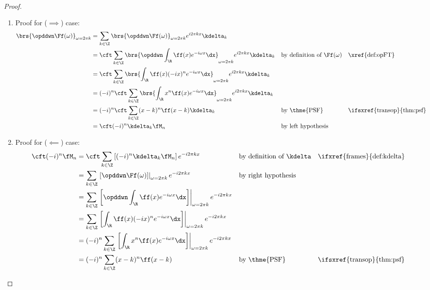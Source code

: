 \begin{proof}
\begin{enumerate}
  \item Proof for ($\implies$) case:
    \begin{align*}
      \brs{\opddwn  \Ff(\omega)}_{\omega=2\pi k}
        &= \sum_{k\in\Z} \brs{\opddwn  \Ff(\omega)}_{\omega=2\pi k}  e^{i2\pi kx} \kdelta_k
      \\&= \cft \sum_{k\in\Z} \brs{\opddwn \int_\R  \ff(x) e^{-i\omega x} \dx}_{\omega=2\pi k} e^{i2\pi kx}  \kdelta_k
        && \text{by definition of $\Ff(\omega)$}
        && \text{\xref{def:opFT}}
      \\&= \cft \sum_{k\in\Z} \brs{\int_\R  \ff(x)(-ix)^n e^{-i\omega x} \dx}_{\omega=2\pi k} e^{i2\pi kx}  \kdelta_k
      \\&= (-i)^n \cft \sum_{k\in\Z} \brs{\int_\R  x^n \ff(x)  e^{-i\omega x} \dx}_{\omega=2\pi k} e^{i2\pi kx}  \kdelta_k
      \\&= (-i)^n \cft \sum_{k\in\Z} (x-k)^n \ff(x-k)  \kdelta_k
        && \text{by \thme{PSF}}
        && \text{\ifsxref{transop}{thm:psf}}
      \\&= \cft (-i)^n \kdelta_k \fM_n
        && \text{by left hypothesis}
    \end{align*}


  \item Proof for ($\impliedby$) case:
    \begin{align*}
      \cft (-i)^n \fM_n
        &= \cft \sum_{k\in\Z} \left[(-i)^n \kdelta_k \fM_n \right] e^{-i2\pi kx}
        && \text{by definition of $\kdelta$}
        && \text{\ifxref{frames}{def:kdelta}}
      \\&= \sum_{k\in\Z} \left.
           \left[\opddwn  \Ff(\omega)\right]\right|_{\omega=2\pi k}
           e^{-i2\pi kx}
        && \text{by right hypothesis}
      \\&= \sum_{k\in\Z} \left.
           \left[
           \opddwn
           \int_\R  \ff(x) e^{-i\omega x} \dx
           \right]
           \right|_{\omega=2\pi k} e^{-i2\pi kx}
      \\&= \sum_{k\in\Z} \left.
           \left[
           \int_\R  \ff(x)(-ix)^n e^{-i\omega x} \dx
           \right]
           \right|_{\omega=2\pi k} e^{-i2\pi kx}
      \\&= (-i)^n \sum_{k\in\Z} \left.
           \left[
           \int_\R  x^n \ff(x)  e^{-i\omega x} \dx
           \right]
           \right|_{\omega=2\pi k} e^{-i2\pi kx}
      \\&= (-i)^n \sum_{k\in\Z} (x-k)^n \ff(x-k)
        && \text{by \thme{PSF}}
        && \text{\ifsxref{transop}{thm:psf}}
    \end{align*}

\end{enumerate}
\end{proof}

